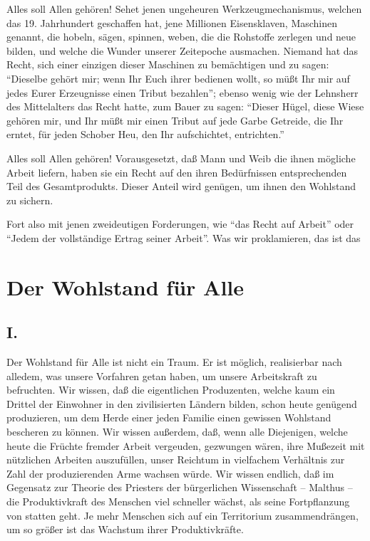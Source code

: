 \documentclass{scrbook}
\begin{document}
Alles soll Allen gehören! Sehet jenen ungeheuren Werkzeugmechanismus, welchen das 19. Jahrhundert geschaffen hat, jene Millionen Eisensklaven, Maschinen genannt, die hobeln, sägen, spinnen, weben, die die Rohstoffe zerlegen und neue bilden, und welche die Wunder unserer Zeitepoche ausmachen. Niemand hat das Recht, sich einer einzigen dieser Maschinen zu bemächtigen und zu sagen: ``Dieselbe gehört mir; wenn Ihr Euch ihrer bedienen wollt, so müßt Ihr mir auf jedes Eurer Erzeugnisse einen Tribut bezahlen''; ebenso wenig wie der Lehnsherr des Mittelalters das Recht hatte, zum Bauer zu sagen: ``Dieser Hügel, diese Wiese gehören mir, und Ihr müßt mir einen Tribut auf jede Garbe Getreide, die Ihr erntet, für jeden Schober Heu, den Ihr aufschichtet, entrichten.''

Alles soll Allen gehören! Vorausgesetzt, daß Mann und Weib die ihnen mögliche Arbeit liefern, haben sie ein Recht auf den ihren Bedürfnissen entsprechenden Teil des Gesamtprodukts. Dieser Anteil wird genügen, um ihnen den Wohlstand zu sichern.

Fort also mit jenen zweideutigen Forderungen, wie ``das Recht auf Arbeit'' oder ``Jedem der vollständige Ertrag seiner Arbeit''. Was wir proklamieren, das ist das 

\chapter{Der Wohlstand für Alle}
\section*{I.}

Der Wohlstand für Alle ist nicht ein Traum. Er ist möglich, realisierbar nach alledem, was unsere Vorfahren getan haben, um unsere Arbeitskraft zu befruchten. Wir wissen, daß die eigentlichen Produzenten, welche kaum ein Drittel der Einwohner in den zivilisierten Ländern bilden, schon heute genügend produzieren, um dem Herde einer jeden Familie einen gewissen Wohlstand bescheren zu können. Wir wissen außerdem, daß, wenn alle Diejenigen, welche heute die Früchte fremder Arbeit vergeuden, gezwungen wären, ihre Mußezeit mit nützlichen Arbeiten auszufüllen, unser Reichtum in vielfachem Verhältnis zur Zahl der produzierenden Arme wachsen würde. Wir wissen endlich, daß im Gegensatz zur Theorie des Priesters der bürgerlichen Wissenschaft – Malthus – die Produktivkraft des Menschen viel schneller wächst, als seine Fortpflanzung von statten geht. Je mehr Menschen sich auf ein Territorium zusammendrängen, um so größer ist das Wachstum ihrer Produktivkräfte.
\end{document}
